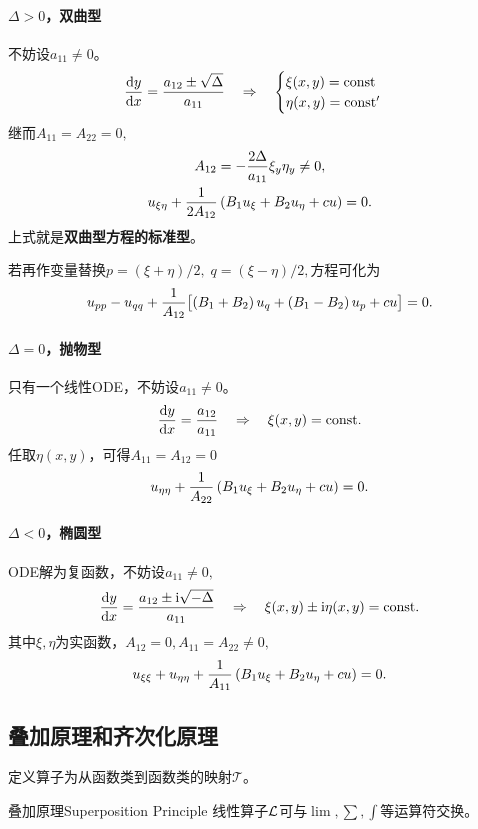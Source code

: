 \paragraph*{$\Delta>0$，双曲型}不妨设$a_{11}\neq 0$。
\begin{align}
	\frac{\mathrm{d}^{\;\!\!}y}{\mathrm{d} x^{\;\!\!}}=\frac{a_{12}\pm\sqrt\Delta}{a_{11}}\quad\Rightarrow\quad
	\begin{cases}
		\xi(x,y)=\mathrm{const} \\
		\eta(x,y)=\mathrm{const}'
	\end{cases}
\end{align}
继而$A_{11}=A_{22}=0,$
\begin{gather}\notag
	A_{12}=-\frac{2\Delta}{a_{11}}\xi_y\eta_y\neq 0,\\
	u_{\xi\eta}+\frac1{2A_{12}}\left(B_1u_\xi+B_2u_\eta+cu\right)=0.
\end{gather}
上式就是\textbf{双曲型方程的标准型}。

若再作变量替换$p=(\xi+\eta)/2,\;q=(\xi-\eta)/2,$方程可化为
\begin{align}
	u_{pp}-u_{qq}+\frac1{A_{12}}\bigl[\left(B_1+B_2\right)u_q+\left(B_1-B_2\right)u_p+cu\bigr]=0.
\end{align}
\paragraph*{$\Delta=0$，抛物型}只有一个线性ODE，不妨设$a_{11}\neq 0$。
\begin{align}
	\frac{\mathrm{d}^{\;\!\!}y}{\mathrm{d} x^{\;\!\!}}=\frac{a_{12}}{a_{11}}\quad\Rightarrow\quad\xi(x,y)=\mathrm{const}.
\end{align}
任取$\eta(x,y)$，可得$A_{11}=A_{12}=0$
\begin{align}
	u_{\eta\eta}+\frac1{A_{22}}\left(B_1u_\xi+B_2u_\eta+cu\right)=0.
\end{align}
\paragraph*{$\Delta<0$，椭圆型}ODE解为复函数，不妨设$a_{11}\neq 0,$
\begin{align}
	\frac{\mathrm{d}^{\;\!\!}y}{\mathrm{d} x^{\;\!\!}}=\frac{a_{12}\pm\mathrm{i}\sqrt{-\Delta}}{a_{11}}\quad\Rightarrow\quad \xi(x,y)\pm\mathrm{i}\eta(x,y)=\mathrm{const}.
\end{align}
其中$\xi,\eta$为实函数，$A_{12}=0,A_{11}=A_{22}\neq 0,$
\begin{align}
	u_{\xi\xi}+u_{\eta\eta}+\frac1{A_{11}}\left(B_1u_\xi+B_2u_\eta+cu\right)=0.
\end{align}
\subsection{叠加原理和齐次化原理}
定义算子为从函数类到函数类的映射$\mathcal T$。
\begin{theorem}{叠加原理}{Superposition Principle}
	线性算子$\mathcal L$可与$\textstyle\lim,\sum,\int$等运算符交换。%
\end{theorem}

